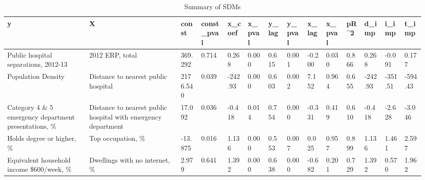 \hspace{-1cm}
\begin{table}[h!]
\fontsize{8}{8}\selectfont %
\setlength{\tabcolsep}{2pt} %
\renewcommand{\arraystretch}{1.5} %
\begin{tabular}{|p{2cm}|p{2cm}|p{1.5cm}|p{1.5cm}|p{1cm}|p{1cm}|p{1cm}|p{1cm}|p{1cm}|p{1cm}|p{1cm}|p{1cm}|p{1cm}|p{1cm}|} %
\hline
y & X & const & const\_pval & x\_coef & x\_pval & y\_lag & y\_pval & x\_lag & x\_pval & pR\^{}2 & d\_imp & i\_imp & t\_imp \\
\hline
Public hospital separations, 2012-13 & 2012 ERP, total & 369.292 & 0.714 & 0.268 & 0.000 & 0.615 & 0.001 & -0.200 & 0.030 & 0.866 & 0.268 & -0.091 & 0.177 \\
\hline
Population Density & Distance to nearest public hospital & 2176.540 & 0.039 & -242.93 & 0.000 & 0.603 & 0.002 & 7.152 & 0.964 & 0.655 & -242.93 & -351.51 & -594.43 \\
\hline
Category 4 \& 5 emergency department presentations, \% & Distance to nearest public hospital with emergency department & 17.092 & 0.036 & -0.418 & 0.014 & 0.754 & 0.000 & -0.331 & 0.419 & 0.610 & -0.418 & -2.628 & -3.046 \\
\hline
Holds degree or higher, \% & Top occupation, \% & -13.875 & 0.016 & 1.136 & 0.000 & 0.553 & 0.007 & 0.025 & 0.957 & 0.899 & 1.136 & 1.461 & 2.597 \\
\hline
Equivalent household income \$600/week, \% & Dwellings with no internet, \% & 2.979 & 0.641 & 1.392 & 0.000 & 0.638 & 0.000 & -0.682 & 0.201 & 0.729 & 1.392 & 0.570 & 1.962 \\
\hline
\end{tabular}
\caption{Summary of SDMs}
\label{tab:summary_SDM}
\end{table}
